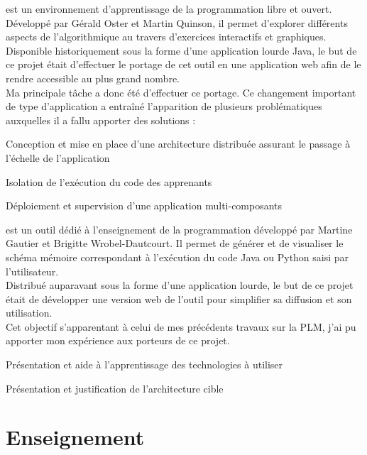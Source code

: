 \documentclass[]{deedy-resume-openfont}
\begin{document}
\href{http://people.irisa.fr/Martin.Quinson/Teaching/PLM/}{} est un environnement d’apprentissage de la programmation libre et ouvert.
Développé par Gérald Oster et Martin Quinson, il permet d’explorer différents aspects de l’algorithmique au travers d’exercices interactifs et graphiques.
\\
Disponible historiquement sous la forme d'une application lourde Java, le but de ce projet était d'effectuer le portage de cet outil en une application web
afin de le rendre accessible au plus grand nombre.
\\
Ma principale tâche a donc été d'effectuer ce portage.
Ce changement important de type d'application a entraîné l'apparition de plusieurs problématiques auxquelles il a fallu apporter des solutions :
\begin{tightemize}
\item Conception et mise en place d'une architecture distribuée assurant le passage à l'échelle de l'application
\item Isolation de l'exécution du code des apprenants
\item Déploiement et supervision d'une application multi-composants
\end{tightemize}
\sectionsep

\href{http://arteoz.loria.fr/}{} est un outil dédié à l'enseignement de la programmation développé par Martine Gautier et Brigitte Wrobel-Dautcourt.
Il permet de générer et de visualiser le schéma mémoire correspondant à l'exécution du code Java ou Python saisi par l'utilisateur.
\\
Distribué auparavant sous la forme d'une application lourde, le but de ce projet était de développer une version web de l'outil pour simplifier sa diffusion et son utilisation.
\\
Cet objectif s'apparentant à celui de mes précédents travaux sur la PLM, j'ai pu apporter mon expérience aux porteurs de ce projet.
\begin{tightemize}
\item Présentation et aide à l'apprentissage des technologies à utiliser
\item Présentation et justification de l'architecture cible
\end{tightemize}
\sectionsep


\section{Enseignement}
\end{document}
